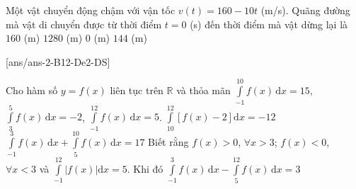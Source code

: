\begin{ex}%
	Một vật chuyển động chậm với vận tốc $v(t)=160-10t$ (m/s). Quãng đường mà vật di chuyển được từ thời điểm $t=0$ (s) đến thời điểm mà vật dừng lại là
	\choice
	{$160$ (m)}
	{\True $1280$ (m)}
	{$0$ (m)}
	{$144$ (m)}
\end{ex}
[ans/ans-2-B12-De2-DS]
\TNTF
\begin{ex}%
	Cho hàm số $y=f(x)$ liên tục trên $\mathbb{R}$ và thỏa mãn $\displaystyle \int\limits_{-1}^{10} f(x)\mathrm{\,d}x=15$, $\displaystyle \int\limits_{3}^{5} f(x) \mathrm{\,d}x=-2$, $\displaystyle \int\limits_{-1}^{12} f(x) \mathrm{\,d}x=5$.
	{$\displaystyle \int\limits_{10}^{12} \left[f(x)-2\right] \mathrm{d}x=-12$}
	{\True $\displaystyle \int\limits_{-1}^{3} f(x) \mathrm{\,d}x + \int\limits_{5}^{10} f(x) \mathrm{\,d}x=17$}
	{Biết rằng $f(x)>0$, $\forall x>3$; $f(x)<0$, $\forall x<3$ và $\displaystyle \int\limits_{-1}^{12} \left|f(x)\right|\mathrm{d}x=5$. Khi đó $\displaystyle \int\limits_{-1}^{3} f(x)\mathrm{\,d}x - \int\limits_{5}^{12} f(x)\mathrm{\,d}x=3$}
	\loigiai{
		
}
\end{ex}
